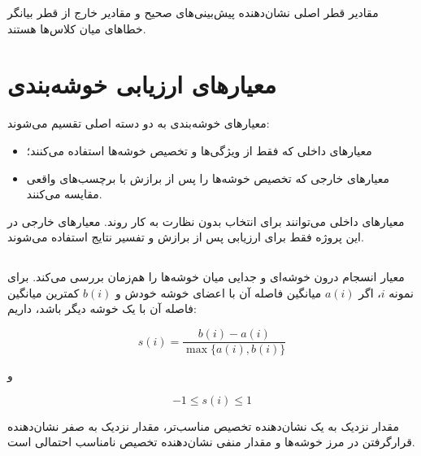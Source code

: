 مقادیر قطر اصلی نشان‌دهنده پیش‌بینی‌های صحیح و مقادیر خارج از قطر بیانگر خطاهای میان کلاس‌ها هستند.


\section{معیارهای ارزیابی خوشه‌بندی}

معیارهای خوشه‌بندی به دو دسته اصلی تقسیم می‌شوند:

\begin{itemize}

	\item معیارهای داخلی که فقط از ویژگی‌ها و تخصیص خوشه‌ها استفاده می‌کنند؛

	\item معیارهای خارجی که تخصیص خوشه‌ها را پس از برازش با برچسب‌های واقعی مقایسه می‌کنند.

\end{itemize}

معیارهای داخلی می‌توانند برای انتخاب بدون نظارت به کار روند. معیارهای خارجی در این پروژه فقط برای ارزیابی پس از برازش و تفسیر نتایج استفاده می‌شوند.


\subsection{}

معیار
انسجام درون خوشه‌ای و جدایی میان خوشه‌ها را هم‌زمان بررسی می‌کند. برای نمونه $i$، اگر $a(i)$ میانگین فاصله آن با اعضای خوشه خودش و $b(i)$ کمترین میانگین فاصله آن با یک خوشه دیگر باشد، داریم:

\begin{equation}
s(i)
=
\frac{
b(i)-a(i)
}{
\max\{a(i),b(i)\}
}
\end{equation}

و

\begin{equation}
-1\leq s(i)\leq1
\end{equation}

مقدار نزدیک به یک نشان‌دهنده تخصیص مناسب‌تر، مقدار نزدیک به صفر نشان‌دهنده قرارگرفتن در مرز خوشه‌ها و مقدار منفی نشان‌دهنده تخصیص نامناسب احتمالی است.


\subsection{}

